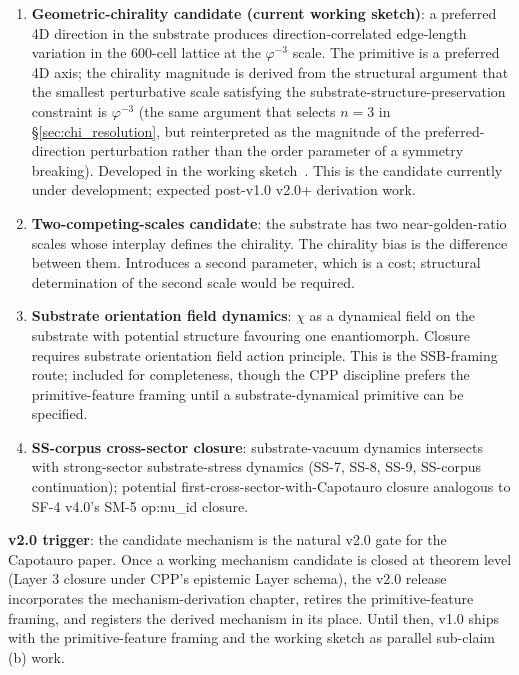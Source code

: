 \documentclass[11pt,letterpaper]{article}
\newcommand{\phig}{\varphi}
\begin{document}
\begin{enumerate}\setlength\itemsep{0.2em}
    \item \textbf{Geometric-chirality candidate (current working sketch)}: a preferred 4D direction in the substrate produces direction-correlated edge-length variation in the 600-cell lattice at the $\phig^{-3}$ scale. The primitive is a preferred 4D axis; the chirality magnitude is derived from the structural argument that the smallest perturbative scale satisfying the substrate-structure-preservation constraint is $\phig^{-3}$ (the same argument that selects $n=3$ in \S\ref{sec:chi_resolution}, but reinterpreted as the magnitude of the preferred-direction perturbation rather than the order parameter of a symmetry breaking). Developed in the working sketch~\cite{abshier_capotauro_chiral_mechanism_sketch}. This is the candidate currently under development; expected post-v1.0 v2.0+ derivation work.
    \item \textbf{Two-competing-scales candidate}: the substrate has two near-golden-ratio scales whose interplay defines the chirality. The chirality bias is the difference between them. Introduces a second parameter, which is a cost; structural determination of the second scale would be required.
    \item \textbf{Substrate orientation field dynamics}: $\chi$ as a dynamical field on the substrate with potential structure favouring one enantiomorph. Closure requires substrate orientation field action principle. This is the SSB-framing route; included for completeness, though the CPP discipline prefers the primitive-feature framing until a substrate-dynamical primitive can be specified.
    \item \textbf{SS-corpus cross-sector closure}: substrate-vacuum dynamics intersects with strong-sector substrate-stress dynamics (SS-7, SS-8, SS-9, SS-corpus continuation); potential first-cross-sector-with-Capotauro closure analogous to SF-4 v4.0's SM-5 op:nu\_id closure.
\end{enumerate}

\textbf{v2.0 trigger}: the candidate mechanism is the natural v2.0 gate for the Capotauro paper. Once a working mechanism candidate is closed at theorem level (Layer 3 closure under CPP's epistemic Layer schema), the v2.0 release incorporates the mechanism-derivation chapter, retires the primitive-feature framing, and registers the derived mechanism in its place. Until then, v1.0 ships with the primitive-feature framing and the working sketch as parallel sub-claim (b) work.
\end{document}
